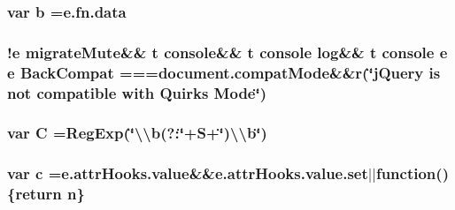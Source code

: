 \hypertarget{jquery-migrate-1_82_81_8min_8js_aa4026ad5544b958e54ce5e106fa1c805}{
\subsubsection[{b}]{\setlength{\rightskip}{0pt plus 5cm}var b ={\bf e.\-fn.\-data}}}\label{jquery-migrate-1_82_81_8min_8js_aa4026ad5544b958e54ce5e106fa1c805}
\hypertarget{jquery-migrate-1_82_81_8min_8js_a0ecb6dcd5691453c7b253ea60ad28e9b}{
\subsubsection[{Back\-Compat}]{ !{\bf e} {\bf migrate\-Mute}\&\& {\bf t} console\&\& {\bf t} console {\bf log}\&\& {\bf t} console {\bf e} {\bf e} Back\-Compat ===document.\-compat\-Mode\&\&{\bf r}(\char`\"{}j\-Query is not compatible with Quirks Mode\char`\"{})}}\label{jquery-migrate-1_82_81_8min_8js_a0ecb6dcd5691453c7b253ea60ad28e9b}
\hypertarget{jquery-migrate-1_82_81_8min_8js_ae59e0ac8d0c43c81f50236f719763efc}{
\subsubsection[{C}]{\setlength{\rightskip}{0pt plus 5cm}var C =Reg\-Exp(\char`\"{}\textbackslash{}\textbackslash{}b(?\-:\char`\"{}+S+\char`\"{})\textbackslash{}\textbackslash{}b\char`\"{})}}\label{jquery-migrate-1_82_81_8min_8js_ae59e0ac8d0c43c81f50236f719763efc}
\hypertarget{jquery-migrate-1_82_81_8min_8js_abce695e0af988ece0826d9ad59b8160d}{
\subsubsection[{c}]{\setlength{\rightskip}{0pt plus 5cm}var c ={\bf e.\-attr\-Hooks.\-value}\&\&e.\-attr\-Hooks.\-value.\-set$\vert$$\vert$function()\{return {\bf n}\}}}\label{jquery-migrate-1_82_81_8min_8js_abce695e0af988ece0826d9ad59b8160d}
